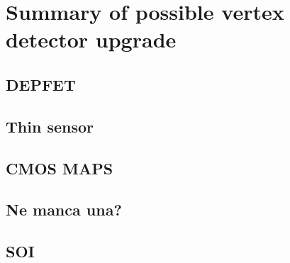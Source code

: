 


\begin{comment}
In particular there are three fundamental aspects in physics performance (concern) in regards to VXD and its upgrade:

\begin{itemize}
\itemsep0em
\item Low momentum track finding; 
\item Vertex and IP resolution;
\item Triggers.
\end{itemize}

\end{comment}


\newpage


\section{Summary of possible vertex detector upgrade}

\subsection{DEPFET}

\subsection{Thin sensor}

\subsection{CMOS MAPS}

\subsection{Ne manca una?}

\subsection{SOI}